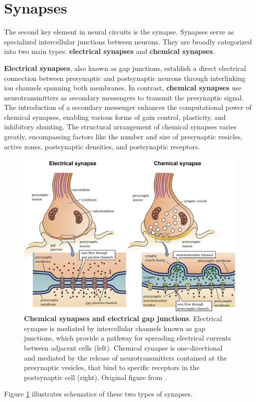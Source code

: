 \documentclass[../main.tex]{subfiles}
\begin{document}
\section{Synapses}
The second key element in neural circuits is the synapse.
Synapses serve as specialized intercellular junctions between neurons.
They are broadly categorized into two main types: \textbf{electrical synapses} and \textbf{chemical synapses}.

\textbf{Electrical synapses}, also known as gap junctions, establish a direct electrical connection between presynaptic and postsynaptic neurons through interlinking ion channels spanning both membranes.
In contrast, \textbf{chemical synapses} use neurotransmitters as secondary messengers to transmit the presynaptic signal.
The introduction of a secondary messenger enhances the computational power of chemical synapses, enabling various forms of gain control, plasticity, and inhibitory shunting.
The structural arrangement of chemical synapses varies greatly, encompassing factors like the number and size of presynaptic vesicles, active zones, postsynaptic densities, and postsynaptic receptors.
\begin{figure}[t]
    \centering
    \includegraphics[width=\textwidth]{chapter1/figures/synapses.png}
    \caption{\textbf{Chemical synapses and electrical gap junctions}.
    Electrical synapse is mediated by intercellular channels known as gap junctions, which provide a pathway for spreading electrical currents between adjacent cells (left).
    Chemical synapse is one-directional and mediated by the release of neurotransmitters contained at the presynaptic vesicles, that bind to specific receptors in the postsynaptic cell (right).
    Original figure from \cite{towlson2018caenorhabditis}.}
   \label{fig:synapses_schematics}
\end{figure}
Figure \ref{fig:synapses_schematics} illustrates schematics of these two types of synapses.
\end{document}
